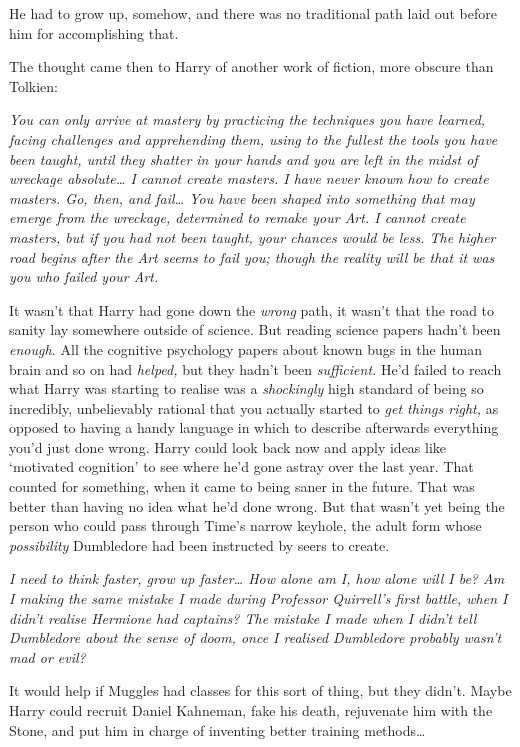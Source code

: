 He had to grow up, somehow, and there was no traditional path laid out before
him for accomplishing that.

The thought came then to Harry of another work of fiction, more obscure than
Tolkien:

\emph{You can only arrive at mastery by practicing the techniques you have
learned, facing challenges and apprehending them, using to the fullest the
tools you have been taught, until they shatter in your hands and you are left
in the midst of wreckage absolute{\ldots} I cannot create masters. I have never
known how to create masters. Go, then, and fail{\ldots} You have been shaped
into something that may emerge from the wreckage, determined to remake your
Art. I cannot create masters, but if you had not been taught, your chances
would be less. The higher road begins after the Art seems to fail you; though
the reality will be that it was you who failed your Art.}

It wasn't that Harry had gone down the \emph{wrong} path, it wasn't that the
road to sanity lay somewhere outside of science. But reading science papers
hadn't been \emph{enough.} All the cognitive psychology papers about known bugs
in the human brain and so on had \emph{helped,} but they hadn't been
\emph{sufficient.} He'd failed to reach what Harry was starting to realise was
a \emph{shockingly} high standard of being so incredibly, unbelievably rational
that you actually started to \emph{get things right,} as opposed to having a
handy language in which to describe afterwards everything you'd just done
wrong. Harry could look back now and apply ideas like `motivated cognition' to
see where he'd gone astray over the last year. That counted for something, when
it came to being saner in the future. That was better than having no idea what
he'd done wrong. But that wasn't yet being the person who could pass through
Time's narrow keyhole, the adult form whose \emph{possibility} Dumbledore had
been instructed by seers to create.

\emph{I need to think faster, grow up faster{\ldots} How alone am I, how alone
will I be? Am I making the same mistake I made during Professor Quirrell's
first battle, when I didn't realise Hermione had captains? The mistake I made
when I didn't tell Dumbledore about the sense of doom, once I realised
Dumbledore probably wasn't mad or evil?}

It would help if Muggles had classes for this sort of thing, but they didn't.
Maybe Harry could recruit Daniel Kahneman, fake his death, rejuvenate him with
the Stone, and put him in charge of inventing better training methods{\ldots}

